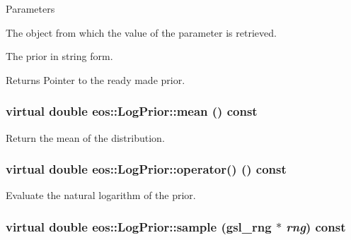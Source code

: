 \begin{DoxyParams}{Parameters}
\item[{\em parameters}]The object from which the value of the parameter is retrieved. \item[{\em serialization}]The prior in string form. \end{DoxyParams}
\begin{DoxyReturn}{Returns}
Pointer to the ready made prior. 
\end{DoxyReturn}
\hypertarget{classeos_1_1LogPrior_afb69583b9532799aa6068d8f4bc3781a}{
\subsubsection[{mean}]{\setlength{\rightskip}{0pt plus 5cm}virtual double eos::LogPrior::mean () const}}
\label{classeos_1_1LogPrior_afb69583b9532799aa6068d8f4bc3781a}
Return the mean of the distribution. \hypertarget{classeos_1_1LogPrior_ac686393e071443d706a104093957e667}{
\subsubsection[{operator()}]{\setlength{\rightskip}{0pt plus 5cm}virtual double eos::LogPrior::operator() () const}}
\label{classeos_1_1LogPrior_ac686393e071443d706a104093957e667}
Evaluate the natural logarithm of the prior. \hypertarget{classeos_1_1LogPrior_a9bbc9805dcb6abbe6d16efff44b43ea3}{
\subsubsection[{sample}]{\setlength{\rightskip}{0pt plus 5cm}virtual double eos::LogPrior::sample (gsl\_\-rng $\ast$ {\em rng}) const}}
\label{classeos_1_1LogPrior_a9bbc9805dcb6abbe6d16efff44b43ea3}

